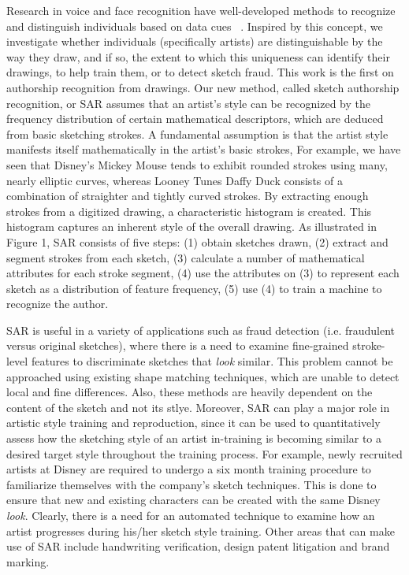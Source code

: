 Research in voice and face recognition have well-developed methods to recognize and distinguish individuals based on data cues ~\cite{tolba2006face}. Inspired by this concept, we investigate whether individuals (specifically artists) are distinguishable by the way they draw, and if so, the extent to which this uniqueness can identify their drawings, to help train them, or to detect sketch fraud. This work is the first on authorship recognition from drawings. Our new method, called sketch authorship recognition, or SAR assumes that an artist's style can be recognized by the frequency distribution of certain mathematical descriptors, which are deduced from basic sketching strokes. A fundamental assumption is that the artist style manifests itself mathematically in the artist's basic strokes, For example, we have seen that Disney's Mickey Mouse tends to exhibit rounded strokes using many, nearly elliptic curves, whereas Looney Tunes Daffy Duck consists of a combination of straighter and tightly curved strokes. By extracting enough strokes from a digitized drawing, a characteristic histogram is created. This histogram captures an inherent style of the overall drawing.  As illustrated in Figure 1, SAR consists of five steps: (1) obtain sketches drawn, (2) extract and segment strokes from each sketch, (3) calculate a number of mathematical attributes for each stroke segment, (4) use the attributes on (3) to represent each sketch as a distribution of feature frequency, (5) use (4) to train a machine to recognize the author.

\vspace{-1mm}
SAR is useful in a variety of applications such as fraud detection (i.e. fraudulent versus original sketches), where there is a need to examine fine-grained stroke-level features to discriminate sketches that \emph{look} similar. This problem cannot be approached using existing shape matching techniques, which are unable to detect local and fine differences. Also, these methods are heavily dependent on the content of the sketch and not its stlye. Moreover, SAR can play a major role in artistic style training and reproduction, since it can be used to quantitatively assess how the sketching style of an artist in-training is becoming similar to a desired target style throughout the training process. For example, newly recruited artists at Disney
are required to undergo a six month training procedure to familiarize themselves with the company's sketch techniques. This is done to ensure that new and existing characters can be created with the same Disney \emph{look}. Clearly, there is a need for an automated technique to examine how an artist progresses during his/her sketch style training. Other areas that can make use of SAR include handwriting verification, design patent litigation and brand marking.

